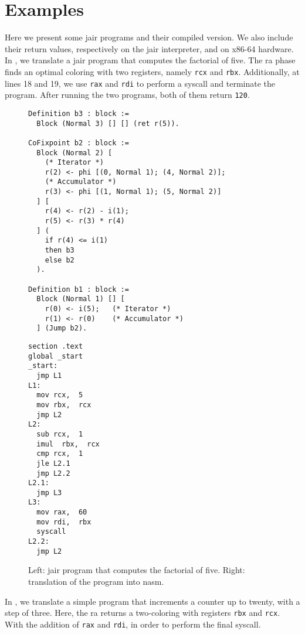 \section{Examples}
\label{sec:examples}

Here we present some \gls{jair} programs and their compiled version. We also include their return values, respectively on the \gls{jair} interpreter, and on x86-64 hardware.
In , we translate a \gls{jair} program that computes the factorial of five. The \gls{ra} phase finds an optimal coloring with two registers, namely \texttt{rcx} and \texttt{rbx}. Additionally, at lines 18 and 19, we use \texttt{rax} and \texttt{rdi} to perform a syscall and terminate the program. After running the two programs, both of them return \texttt{120}.

\begin{figure}[ht]
\begin{minipage}{0.68\linewidth}
\centering
\begin{lstlisting}[style=Rocq]
Definition b3 : block :=
  Block (Normal 3) [] [] (ret r(5)).

CoFixpoint b2 : block :=
  Block (Normal 2) [
    (* Iterator *)
    r(2) <- phi [(0, Normal 1); (4, Normal 2)];
    (* Accumulator *)
    r(3) <- phi [(1, Normal 1); (5, Normal 2)]
  ] [
    r(4) <- r(2) - i(1);
    r(5) <- r(3) * r(4)
  ] (
    if r(4) <= i(1)
    then b3
    else b2
  ).

Definition b1 : block :=
  Block (Normal 1) [] [
    r(0) <- i(5);   (* Iterator *)
    r(1) <- r(0)    (* Accumulator *)
  ] (Jump b2).
\end{lstlisting}
\end{minipage}
\hfill
\begin{minipage}{0.28\linewidth}
\centering
\begin{lstlisting}[style=NASM]
section .text
global _start
_start:
  jmp L1
L1:
  mov rcx,  5
  mov rbx,  rcx
  jmp L2
L2:
  sub rcx,  1
  imul  rbx,  rcx
  cmp rcx,  1
  jle L2.1
  jmp L2.2
L2.1:
  jmp L3
L3:
  mov rax,  60
  mov rdi,  rbx
  syscall
L2.2:
  jmp L2
\end{lstlisting}
\end{minipage}
\caption{Left: \gls{jair} program that computes the factorial of five. Right: translation of the program into \gls{nasm}.}
\label{fig:ex1}
\end{figure}

In , we translate a simple program that increments a counter up to twenty, with a step of three. Here, the \gls{ra} returns a two-coloring with registers \texttt{rbx} and \texttt{rcx}. With the addition of \texttt{rax} and \texttt{rdi}, in order to perform the final syscall.

